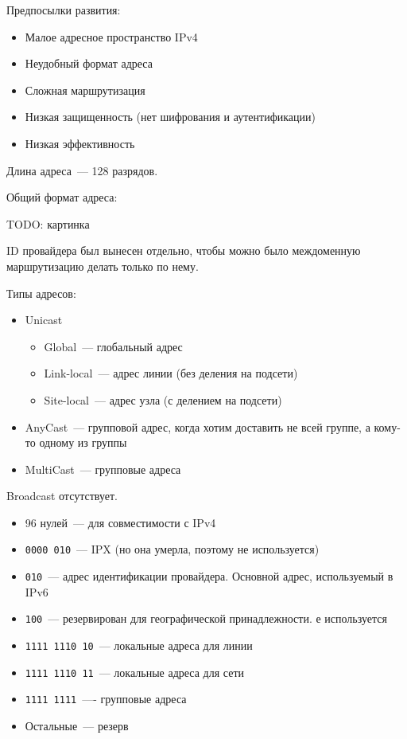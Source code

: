 
Предпосылки развития:
\begin{itemize}
    \item Малое адресное пространство IPv4
    \item Неудобный формат адреса
    \item Сложная маршрутизация
    \item Низкая защищенность (нет шифрования и аутентификации)
    \item Низкая эффективность
\end{itemize}


Длина адреса~--- 128 разрядов.

Общий формат адреса:

TODO: картинка

ID провайдера был вынесен отдельно, чтобы можно было междоменную маршрутизацию делать только по нему.

Типы адресов:

\begin{itemize}
    \item Unicast
    \begin{itemize}
        \item Global~--- глобальный адрес
        \item Link-local~--- адрес линии (без деления на подсети)
        \item Site-local~--- адрес узла (с делением на подсети)
    \end{itemize}
    \item AnyCast~--- групповой адрес, когда хотим доставить не всей группе, а кому-то одному из группы
    \item MultiCast~--- групповые адреса
\end{itemize}

Broadcast отсутствует.


\begin{itemize}
    \item 96 нулей~--- для совместимости с IPv4
    \item {\tt 0000 010}~--- IPX (но она умерла, поэтому не используется)
    \item {\tt 010}~--- адрес идентификации провайдера. Основной адрес, используемый в IPv6
    \item {\tt 100}~--- резервирован для географической принадлежности. е используется
    \item {\tt 1111 1110 10}~--- локальные адреса для линии
    \item {\tt 1111 1110 11}~--- локальные адреса для сети
    \item {\tt 1111 1111}~---- групповые адреса
    \item Остальные~--- резерв
\end{itemize}

